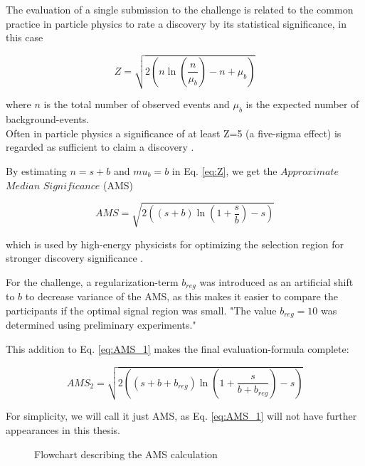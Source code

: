 The evaluation of a single submission to the challenge is related to the common practice in particle physics to rate a discovery by its statistical significance, in this case 


\begin{equation}\label{eq:Z}
	Z = \sqrt{2 \left(n \ln{\left( \frac{n}{\mu_b} \right)} -
	n + \mu_b \right)}
\end{equation}

where $n$ is the total number of observed events and $\mu_b$ is the expected number of background-events.\\
Often in particle physics a significance of at least Z=5 (a five-sigma effect) is regarded as sufficient to claim a discovery \cite{higgsPaper}.

By estimating $n=s+b$ and $mu_b = b$ in Eq. \eqref{eq:Z}, we get the $Approximate$ $Median$ $Significance$ (AMS)

\begin{equation}\label{eq:AMS_1}
	AMS = \sqrt{2 \left( \left( s+b \right) \ln{ \left(1+ \frac{s}
	{b}  \right)} - s \right)}
\end{equation}

which is used by high-energy physicists for optimizing the selection region for stronger discovery significance \cite{higgsPaper}. 

For the challenge, a regularization-term $b_{reg}$ was introduced as an artificial shift to $b$ to decrease variance of the AMS, as this makes it easier to compare the participants if the optimal signal region was small. "The value $b_{reg}=10$ was determined using preliminary experiments." \cite{higgsPaper}

This addition to Eq. \eqref{eq:AMS_1} makes the final evaluation-formula complete:

\begin{equation}\label{eq:AMS_2}
	AMS_2 = \sqrt{2 \left( \left( s+b+b_{reg} \right) \ln{ \left(1+ \frac{s}
	{b+b_{reg}}  \right)} - s \right)}
\end{equation}

For simplicity, we will call it just AMS, as Eq. \eqref{eq:AMS_1} will not have further appearances in this thesis.

\begin{figure}
	\caption{Flowchart describing the AMS calculation}
\end{figure}

